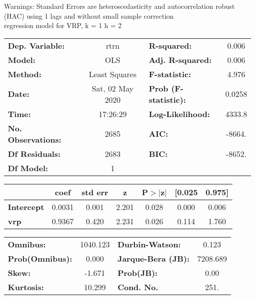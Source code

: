 Warnings: \newline
 [1] Standard Errors are heteroscedasticity and autocorrelation robust (HAC) using 1 lags and without small sample correction\\ 

regression model for VRP, k = 1 h = 2\begin{center}
\begin{tabular}{lclc}
\toprule
\textbf{Dep. Variable:}    &       rtrn       & \textbf{  R-squared:         } &     0.006   \\
\textbf{Model:}            &       OLS        & \textbf{  Adj. R-squared:    } &     0.006   \\
\textbf{Method:}           &  Least Squares   & \textbf{  F-statistic:       } &     4.976   \\
\textbf{Date:}             & Sat, 02 May 2020 & \textbf{  Prob (F-statistic):} &   0.0258    \\
\textbf{Time:}             &     17:26:29     & \textbf{  Log-Likelihood:    } &    4333.8   \\
\textbf{No. Observations:} &        2685      & \textbf{  AIC:               } &    -8664.   \\
\textbf{Df Residuals:}     &        2683      & \textbf{  BIC:               } &    -8652.   \\
\textbf{Df Model:}         &           1      & \textbf{                     } &             \\
\bottomrule
\end{tabular}
\begin{tabular}{lcccccc}
                   & \textbf{coef} & \textbf{std err} & \textbf{z} & \textbf{P$> |$z$|$} & \textbf{[0.025} & \textbf{0.975]}  \\
\midrule
\textbf{Intercept} &       0.0031  &        0.001     &     2.201  &         0.028        &        0.000    &        0.006     \\
\textbf{vrp}       &       0.9367  &        0.420     &     2.231  &         0.026        &        0.114    &        1.760     \\
\bottomrule
\end{tabular}
\begin{tabular}{lclc}
\textbf{Omnibus:}       & 1040.123 & \textbf{  Durbin-Watson:     } &    0.123  \\
\textbf{Prob(Omnibus):} &   0.000  & \textbf{  Jarque-Bera (JB):  } & 7208.689  \\
\textbf{Skew:}          &  -1.671  & \textbf{  Prob(JB):          } &     0.00  \\
\textbf{Kurtosis:}      &  10.299  & \textbf{  Cond. No.          } &     251.  \\
\bottomrule
\end{tabular}
\end{center}

